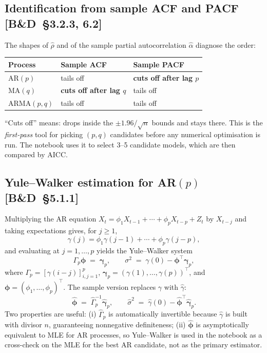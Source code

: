 \documentclass[11pt,a4paper]{article}
\newcommand{\BD}[1]{\textsc{[B\&D~§#1]}}
\begin{document}
\subsection*{Identification from sample ACF and PACF \BD{3.2.3, 6.2}}
The shapes of $\hat\rho$ and of the sample partial autocorrelation
$\hat\alpha$ diagnose the order:
\begin{center}
\begin{tabular}{lll}
\toprule
Process & Sample ACF & Sample PACF \\
\midrule
AR$(p)$   & tails off  & \textbf{cuts off after lag $p$} \\
MA$(q)$   & \textbf{cuts off after lag $q$} & tails off \\
ARMA$(p,q)$ & tails off & tails off \\
\bottomrule
\end{tabular}
\end{center}
``Cuts off'' means: drops inside the $\pm 1.96/\sqrt{n}$ bounds and stays there.
This is the \emph{first-pass} tool for picking $(p, q)$ candidates before any
numerical optimisation is run. The notebook uses it to select 3--5 candidate
models, which are then compared by AICC.

\subsection*{Yule--Walker estimation for AR$(p)$ \BD{5.1.1}}
Multiplying the AR equation $X_t = \phi_1 X_{t-1} + \cdots + \phi_p X_{t-p} + Z_t$
by $X_{t-j}$ and taking expectations gives, for $j \geq 1$,
$$\gamma(j) = \phi_1 \gamma(j-1) + \cdots + \phi_p \gamma(j-p),$$
and evaluating at $j = 1, \ldots, p$ yields the Yule--Walker system
\begin{equation}
\Gamma_p \boldsymbol\phi \;=\; \boldsymbol\gamma_p,
\qquad
\sigma^2 \;=\; \gamma(0) - \boldsymbol\phi^\top \boldsymbol\gamma_p,
\label{eq:yw}
\end{equation}
where
$\Gamma_p = [\gamma(i-j)]_{i,j=1}^p$,
$\boldsymbol\gamma_p = (\gamma(1), \ldots, \gamma(p))^\top$, and
$\boldsymbol\phi = (\phi_1, \ldots, \phi_p)^\top$.
The sample version replaces $\gamma$ with $\hat\gamma$:
\begin{equation}
\hat{\boldsymbol\phi} \;=\; \hat\Gamma_p^{-1} \hat{\boldsymbol\gamma}_p,
\qquad
\hat\sigma^2 \;=\; \hat\gamma(0) - \hat{\boldsymbol\phi}^\top \hat{\boldsymbol\gamma}_p.
\end{equation}
Two properties are useful: (i) $\hat\Gamma_p$ is automatically invertible
because $\hat\gamma$ is built with divisor $n$, guaranteeing nonnegative
definiteness; (ii) $\hat{\boldsymbol\phi}$ is asymptotically equivalent to MLE
for AR processes, so Yule--Walker is used in the notebook as a cross-check on
the MLE for the best AR candidate, not as the primary estimator.
\end{document}

